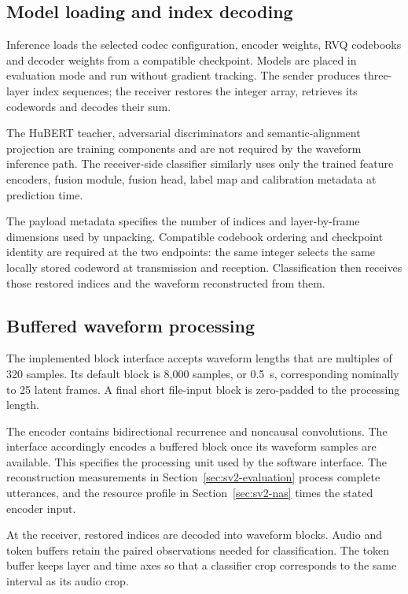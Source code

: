 \subsection{Model loading and index decoding}
Inference loads the selected codec configuration, encoder weights, RVQ codebooks and decoder weights from a compatible checkpoint. Models are placed in evaluation mode and run without gradient tracking. The sender produces three-layer index sequences; the receiver restores the integer array, retrieves its codewords and decodes their sum.

The HuBERT teacher, adversarial discriminators and semantic-alignment projection are training components and are not required by the waveform inference path. The receiver-side classifier similarly uses only the trained feature encoders, fusion module, fusion head, label map and calibration metadata at prediction time.

The payload metadata specifies the number of indices and layer-by-frame dimensions used by unpacking. Compatible codebook ordering and checkpoint identity are required at the two endpoints: the same integer selects the same locally stored codeword at transmission and reception. Classification then receives those restored indices and the waveform reconstructed from them.

\subsection{Buffered waveform processing}
The implemented block interface accepts waveform lengths that are multiples of 320 samples. Its default block is 8,000 samples, or 0.5~s, corresponding nominally to 25 latent frames. A final short file-input block is zero-padded to the processing length.

The encoder contains bidirectional recurrence and noncausal convolutions. The interface accordingly encodes a buffered block once its waveform samples are available. This specifies the processing unit used by the software interface. The reconstruction measurements in Section~\ref{sec:sv2-evaluation} process complete utterances, and the resource profile in Section~\ref{sec:sv2-nas} times the stated encoder input.

At the receiver, restored indices are decoded into waveform blocks. Audio and token buffers retain the paired observations needed for classification. The token buffer keeps layer and time axes so that a classifier crop corresponds to the same interval as its audio crop.

